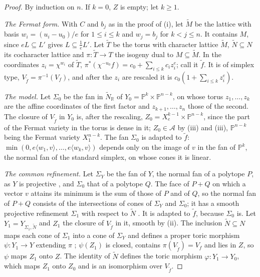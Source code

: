 \documentclass[11pt,reqno]{amsart}
\theoremstyle{plain}
\theoremstyle{definition}
\theoremstyle{remark}
\newcommand{\RR}{\mathbb{R}}
\newcommand{\PP}{\mathbb{P}}
\begin{document}
\begin{proof}
By induction on $n$. If $k=0$, $Z$ is empty; let $k\ge1$.

\emph{The Fermat form.} With $C$ and $b_{j}$ as in the proof of
(i), let $\widetilde M$ be the lattice with basis
$w_{i}=(u_{i}-u_{0})/e$ for $1\le i\le k$ and $w_{j}=b_{j}$ for $k<j\le n$.
It contains $M$, since $eL\subseteq L'$ gives $L\subseteq\frac1eL'$. Let
$\widetilde T$ be the torus with character lattice $\widetilde M$,
$\widetilde N\subseteq N$ its cocharacter lattice and
$\pi\colon\widetilde T\to T$ the isogeny dual to $M\subseteq\widetilde M$.
In the coordinates $z_{i}=\chi^{w_{i}}$ of $\widetilde T$,
$\pi^{*}(\chi^{-u_{0}}f)=c_{0}+\sum_{i\le k}c_{i}z_{i}^{e}$; call it
$\widetilde f$. It is of simplex type, $V_{\widetilde f}=\pi^{-1}(V_{f})$,
and after the $z_{i}$ are rescaled it is $c_{0}(1+\sum_{i\le k}z_{i}^{e})$.

\emph{The model.} Let $\Sigma_{0}$ be the fan in $\widetilde N_{\RR}$ of
$Y_{0}=\PP^{k}\times\PP^{n-k}$, on whose torus $z_{1},\dots,z_{k}$ are the
affine coordinates of the first factor and $z_{k+1},\dots,z_{n}$ those of the
second. The closure of $V_{\widetilde f}$ in $Y_{0}$ is, after the
rescaling, $Z_{0}=X^{k-1}_{e}\times\PP^{n-k}$, since the part of the Fermat
variety in the torus is dense in it; $Z_{0}\in\mathcal{A}$ by
(iii) and (iii), $\PP^{n-k}$ being
the Fermat variety $X^{n-k}_{1}$. The fan $\Sigma_{0}$ is adapted to
$\widetilde f$: $\min(0,e\langle w_{1},v\rangle,\dots,e\langle
w_{k},v\rangle)$ depends only on the image of $v$ in the fan of $\PP^{k}$,
the normal fan of the standard simplex, on whose cones it is linear.

\emph{The common refinement.} Let $\Sigma_{Y}$ be the fan of $Y$, the normal
fan of a polytope $P$, as $Y$ is projective \cite[Chapter~2]{CLS11}, and
$\Sigma_{0}$ that of a polytope $Q$. The face of $P+Q$ on which a vector $v$
attains its minimum is the sum of those of $P$ and of $Q$, so the normal fan
of $P+Q$ consists of the intersections of cones of $\Sigma_{Y}$ and
$\Sigma_{0}$; it has a smooth projective refinement $\Sigma_{1}$ with
respect to $\widetilde N$ \cite[Chapter~11]{CLS11}. It is adapted to
$\widetilde f$, because $\Sigma_{0}$ is. Let
$Y_{1}=Y_{\Sigma_{1},\widetilde N}$ and $Z_{1}$ the closure of
$V_{\widetilde f}$ in it, smooth by (ii). The
inclusion $\widetilde N\subseteq N$ maps each cone of $\Sigma_{1}$ into a cone
of $\Sigma_{Y}$ and defines a proper toric morphism $\psi\colon Y_{1}\to Y$
extending $\pi$ \cite[Chapter~3]{CLS11}; $\psi(Z_{1})$ is closed, contains
$\pi(V_{\widetilde f})=V_{f}$ and lies in $Z$, so $\psi$ maps $Z_{1}$ onto
$Z$. The identity of $\widetilde N$ defines the toric morphism
$\varphi\colon Y_{1}\to Y_{0}$, which maps $Z_{1}$ onto $Z_{0}$ and is an
isomorphism over $V_{\widetilde f}$.


\end{proof}
\end{document}

